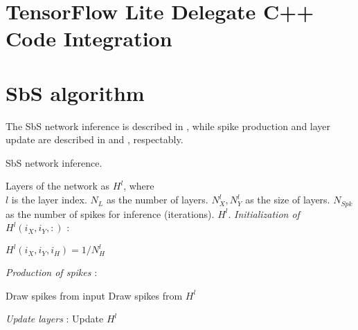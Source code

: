 \section{TensorFlow Lite Delegate C++ Code Integration}
\label{chap:appendix_delegate}

\FloatBarrier
\section{SbS algorithm}
\label{chap:appendix}
The SbS network inference is described in , while spike production and layer update are described in  and , respectably.

\begin{algorithm}[t]
	\caption{SbS network inference.} \label{alg:inference}
	
	\begin{algorithmic}
		\SetAlgoLined
		\renewcommand{\algorithmicrequire}{\textbf{input:}}
		\renewcommand{\algorithmicensure}{\textbf{output:}}
		\REQUIRE Layers of the network as $H^l$, where\\
		$l$ is the layer index.
		\REQUIRE $N_{L}$ as the number of layers.
		\REQUIRE $N^l_{X}, N^l_{Y}$ as the size of layers.
		\REQUIRE $N_{Spk}$ as the number of spikes for inference (iterations).
		\ENSURE $H^l$.
		\STATE \textit{Initialization of $H^l(i_X,i_Y,:)$} :
		
		\STATE $H^l(i_X,i_Y,i_{H}) = 1/N^l_H$
		\ENDFOR
		\ENDFOR
		\ENDFOR
		\ENDIF
		
		\textit{Production of spikes} :
		
		\STATE Draw spikes from input 
		\ELSE
		\STATE Draw spikes from $H^l$ 
		\ENDIF
		
		\ENDFOR
		
		\textit{Update layers} :
		\STATE Update $H^l$ 
		\ENDFOR
		
		\ENDFOR
	\end{algorithmic} 
\end{algorithm}


